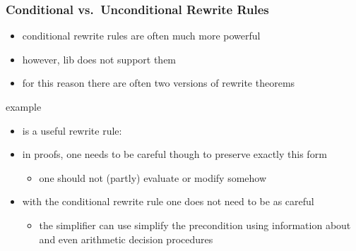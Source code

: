 \begin{frame}
\frametitle{Conditional vs.\ Unconditional Rewrite Rules}

\begin{itemize}
\item conditional rewrite rules are often much more powerful
\item however,  lib does not support them
\item for this reason there are often two versions of rewrite theorems
\end{itemize}

\begin{exampleblock}{ example}
\begin{itemize}
\item {} is a useful rewrite rule:\\
\item in proofs, one needs to be careful though to preserve exactly this form
\begin{itemize}
\item one should not (partly) evaluate  or modify  somehow
\end{itemize}
\item with the conditional rewrite rule  one does not need to be as careful \\
\begin{itemize}
\item the simplifier can use simplify the precondition using information about  and even arithmetic decision procedures
\end{itemize}
\end{itemize}
\end{exampleblock}

\end{frame}


